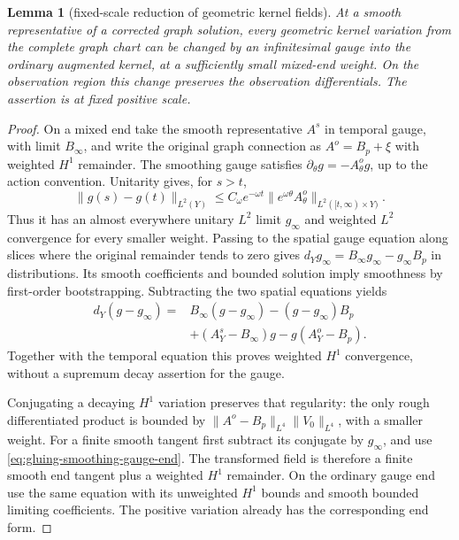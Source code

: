 \documentclass[11pt]{amsart}
\newtheorem{lemma}[theorem]{Lemma}
\theoremstyle{definition}
\theoremstyle{remark}
\theoremstyle{plain}
\begin{document}
\begin{lemma}[fixed-scale reduction of geometric kernel fields]
\label{lem:gluing-linear-gauge-reduction}
At a smooth representative of a corrected graph solution, every
geometric kernel variation from the complete graph chart can be changed
by an infinitesimal gauge into the ordinary augmented kernel, at a
sufficiently small mixed-end weight. On the observation region this
change preserves the observation differentials. The assertion is at
fixed positive scale.
\end{lemma}

\begin{proof}
On a mixed end take the smooth representative $A^s$ in temporal
gauge, with limit $B_\infty$, and write the original graph
connection as $A^o=B_p+\xi$ with weighted $H^1$ remainder.
The smoothing gauge satisfies $\partial_\theta g=-A^o_\theta g$,
up to the action convention. Unitarity gives, for $s>t$,
\[
 \|g(s)-g(t)\|_{L^2(Y)}
 \leq C_\omega e^{-\omega t}
                    \|e^{\omega\theta}A^o_\theta\|_{L^2([t,\infty)\times Y)}.
\]
Thus it has an almost everywhere unitary $L^2$ limit $g_\infty$
and weighted $L^2$ convergence for every smaller weight.
Passing to the spatial gauge equation along slices where the original
remainder tends to zero gives
$d_Yg_\infty=B_\infty g_\infty-g_\infty B_p$ in distributions.
Its smooth coefficients and bounded solution imply smoothness by
first-order bootstrapping. Subtracting the two spatial equations yields
\begin{equation}\label{eq:gluing-smoothing-gauge-end}
 \begin{split}
 d_Y(g-g_\infty)={}&B_\infty(g-g_\infty)-(g-g_\infty)B_p\\
                 &+(A_Y^s-B_\infty)g-g(A_Y^o-B_p).
 \end{split}
\end{equation}
Together with the temporal equation this proves weighted $H^1$
convergence, without a supremum decay assertion for the gauge.

Conjugating a decaying $H^1$ variation preserves that regularity:
the only rough differentiated product is bounded by
$\|A^o-B_p\|_{L^4}\|V_0\|_{L^4}$, with a smaller weight.
For a finite smooth tangent first subtract its conjugate by
$g_\infty$, and use \eqref{eq:gluing-smoothing-gauge-end}.
The transformed field is therefore a finite smooth end tangent
plus a weighted $H^1$ remainder. On the ordinary gauge end
use the same equation with its unweighted $H^1$ bounds and
smooth bounded limiting coefficients. The positive variation already
has the corresponding end form.


\end{proof}
\end{document}
